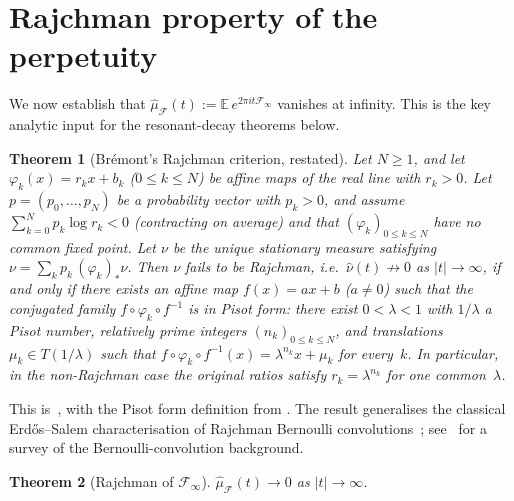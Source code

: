 \documentclass[11pt,a4paper]{amsart}
\theoremstyle{plain}
\newtheorem{theorem}{Theorem}[section]
\theoremstyle{definition}
\newcommand{\E}{\mathbb{E}}
\begin{document}
\section{Rajchman property of the perpetuity}\label{sec:rajchman}

We now establish that $\widehat\mu_{\mathcal F}(t):=\E\,e^{2\pi i t\mathcal F_\infty}$
vanishes at infinity.
This is the key analytic input for the resonant-decay theorems below.

\begin{theorem}[Br\'emont's Rajchman criterion, restated]
\label{thm:bremont-restated}
Let $N\ge 1$, and let $\varphi_k(x)=r_k x+b_k$ ($0\le k\le N$) be affine maps
of the real line with $r_k>0$.
Let $p=(p_0,\dots,p_N)$ be a probability vector with $p_k>0$, and assume
$\sum_{k=0}^N p_k\log r_k<0$ (contracting on average) and that
$(\varphi_k)_{0\le k\le N}$ have no common fixed point.
Let $\nu$ be the unique stationary measure satisfying
$\nu=\sum_k p_k\,(\varphi_k)_*\nu$.
Then $\nu$ fails to be Rajchman, i.e.\ $\widehat\nu(t)\not\to 0$ as
$|t|\to\infty$, if and only if there exists an affine map
$f(x)=ax+b$ ($a\ne 0$) such that the conjugated family
$f\circ\varphi_k\circ f^{-1}$ is in \emph{Pisot form}:
there exist $0<\lambda<1$ with $1/\lambda$ a Pisot number, relatively
prime integers $(n_k)_{0\le k\le N}$, and translations
$\mu_k\in T(1/\lambda)$ such that
$f\circ\varphi_k\circ f^{-1}(x)=\lambda^{n_k}x+\mu_k$ for every~$k$.
In particular, in the non-Rajchman case the original ratios satisfy
$r_k=\lambda^{n_k}$ for one common~$\lambda$.
\end{theorem}

This is~\cite[Theorem 2.5]{Bremont}, with the Pisot form definition from
\cite[Definition 2.3]{Bremont}.
The result generalises the classical Erd\H{o}s--Salem characterisation of
Rajchman Bernoulli convolutions~\cite{Erdos1939,Salem};
see~\cite{PSS} for a survey of the Bernoulli-convolution background.

\begin{theorem}[Rajchman of $\mathcal F_\infty$]\label{thm:rajchman}
$\widehat\mu_{\mathcal F}(t)\to0$ as $|t|\to\infty$.
\end{theorem}
\end{document}
